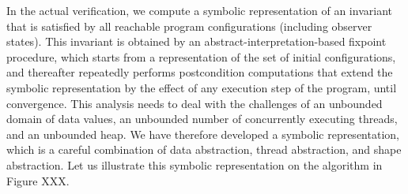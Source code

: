 In the actual verification, we compute a symbolic representation
of an invariant that is satisfied by all reachable program configurations (including observer states).
This invariant is obtained by an abstract-interpretation-based
fixpoint procedure, which starts
from a representation of the set of initial configurations, and
thereafter repeatedly performs
postcondition computations that extend the
symbolic representation by the effect of any execution step of the program,
until convergence.
This analysis needs to deal with the challenges of an unbounded domain of
data values, an unbounded number of concurrently executing threads, and an
unbounded heap. We have therefore developed a symbolic representation, which
is a careful combination of
data abstraction, thread abstraction, and shape abstraction. 
Let us illustrate this symbolic representation on the algorithm in Figure XXX.

